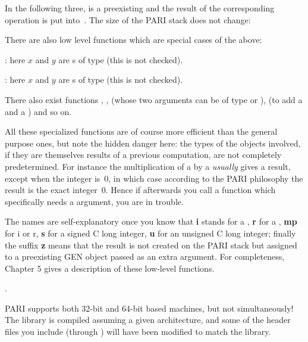 

\noindent In the following three,  is a preexisting  and the
result of the corresponding operation is put into~. The size of the PARI
stack does not change:




\noindent There are also low level functions which are special cases of the
above:

: here $x$ and $y$ are s of type
 (this is not checked).

: here $x$ and $y$ are s of
type  (this is not checked).

\noindent
There also exist functions , ,  (whose
two arguments can be of type  or ),  (to add a
 and a ) and so on.

All these specialized functions are of course more efficient than the general
purpose ones, but note the hidden danger here: the types of the objects
involved, if they are themselves results of a previous computation, are not
completely predetermined. For instance the multiplication of a  by
a  \emph{usually} gives a  result, except when the integer
is~0, in which case according to the PARI philosophy the result is the exact
integer~0. Hence if afterwards you call a function which specifically needs a
 argument, you are in trouble.

The names are self-explanatory once you know that {\bf i} stands for a
, {\bf r} for a , {\bf mp} for i or r, {\bf s} for a
signed C long integer, {\bf u} for an unsigned C long integer; finally the
suffix {\bf z} means that the result is not created on the PARI stack but
assigned to a preexisting GEN object passed as an extra argument. For
completeness, Chapter 5 gives a description of these low-level functions.

.

\noindent
PARI supports both 32-bit and 64-bit based machines, but not simultaneously!
The library is compiled assuming a given architecture, and some
of the header files you include (through ) will have been
modified to match the library.

